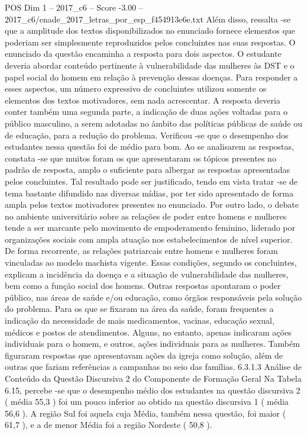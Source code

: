 \begin{textsample}{POS Dim 1 – 2017\_c6 – Score -3.00 – 2017\_c6/enade\_2017\_letras\_por\_esp\_f454913e6e.txt}
Além disso, ressalta -se que a amplitude dos textos disponibilizados no enunciado fornece elementos que poderiam ser simplesmente reproduzidos pelos concluintes nas suas respostas.
O enunciado da questão encaminha a resposta para dois aspectos.
O estudante deveria abordar conteúdo pertinente à vulnerabilidade das mulheres às DST e o papel social do homem em relação à prevenção dessas doenças.
Para responder a esses aspectos, um número expressivo de concluintes utilizou somente os elementos dos textos motivadores, sem nada acrescentar.
A resposta deveria conter também uma segunda parte, a indicação de duas ações voltadas para o público masculino, a serem adotadas no âmbito das políticas públicas de saúde ou de educação, para a redução do problema.
Verificou -se que o desempenho dos estudantes nessa questão foi de médio para bom.
Ao se analisarem as respostas, constata -se que muitos foram os que apresentaram os tópicos presentes no padrão de resposta, amplo o suficiente para albergar as respostas apresentadas pelos concluintes.
Tal resultado pode ser justificado, tendo em vista tratar -se de tema bastante difundido nas diversas mídias, por ter sido apresentado de forma ampla pelos textos motivadores presentes no enunciado.
Por outro lado, o debate no ambiente universitário sobre as relações de poder entre homens e mulheres tende a ser marcante pelo movimento de empoderamento feminino, liderado por organizações sociais com ampla atuação nos estabelecimentos de nível superior.
De forma recorrente, as relações patriarcais entre homens e mulheres foram vinculadas ao modelo machista vigente.
Essas condições, segundo os concluintes, explicam a incidência da doença e a situação de vulnerabilidade das mulheres, bem como a função social dos homens.
Outras respostas apontaram o poder público, nas áreas de saúde e/ou educação, como órgãos responsáveis pela solução do problema.
Para os que se fixaram na área da saúde, foram frequentes a indicação da necessidade de mais medicamentos, vacinas, educação sexual, médicos e postos de atendimentos.
Alguns, no entanto, apenas indicaram ações individuais para o homem, e outros, ações individuais para as mulheres.
Também figuraram respostas que apresentavam ações da igreja como solução, além de outras que faziam referências a campanhas no seio das famílias. 6.3.1.3 Análise de Conteúdo da Questão Discursiva 2 do Componente de Formação Geral Na Tabela 6.15, percebe -se que o desempenho médio dos estudantes na questão discursiva 2 ( média 55,3 ) foi um pouco inferior ao obtido na questão discursiva 1 ( média 56,6 ).
A região Sul foi aquela cuja Média, também nessa questão, foi maior ( 61,7 ), e a de menor Média foi a região Nordeste ( 50,8 ).

\end{textsample}

